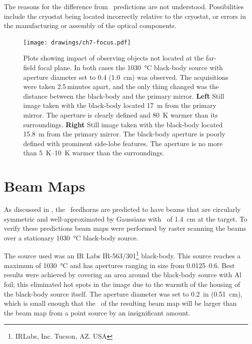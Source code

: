 The reasons for the difference from \ZEMAX\ predictions are not understood.
Possibilities include the cryostat being located incorrectly relative to the cryostat, or errors in the manufacturing or assembly of the optical components.

\begin{figure}
\centering
\texttt{[image: drawings/ch7-focus.pdf]}
\caption[Focus distance plots]{
  Plots showing impact of observing objects not located at the far-field focal plane.
  In both cases the \SI{1030}{\celsius} black-body source with aperture diameter set to \SI{0.4}{\in} (\SI{1.0}{\cm}) was observed. The acquisitions were taken 2.5\,minutes apart, and the only thing changed was the distance between the black-body and the primary mirror.
  \textbf{Left} Still image taken with the black-body located \SI{17}{\m} from the primary mirror.
  The aperture is clearly defined and \SI{80}{\K} warmer than its surroundings.
  \textbf{Right} Still image taken with the black-body located \SI{15.8}{\m} from the primary mirror.
  The black-body aperture is poorly defined with prominent side-lobe features.
  The aperture is no more than \SIrange{5}{10}{\K} warmer than the surroundings.
}
\label{fig:ch7-focus}
\end{figure}

\section{Beam Maps} \label{sec:ch7-beam-maps}

As discussed in , the \Imager\ feedhorns are predicted to have beams that are circularly symmetric and well-approximated by Gaussians with \FWHM\ of \SI{1.4}{\cm} at the target.
To verify these predictions beam maps were performed by raster scanning the beams over a stationary \SI{1030}{\celsius} black-body source.

The source used was an IR Labs IR-563/301\footnote{IRLabs, Inc. Tucson, AZ. USA} black-body.
This source reaches a maximum of \SI{1030}{\celsius} and has apertures ranging in size from \SIrange{0.0125}{0.6}{\in}.
Best results were achieved by covering an area around the black-body source with Al foil; this eliminated hot spots in the image due to the warmth of the housing of the black-body source itself.
The aperture diameter was set to \SI{0.2}{in} (\SI{0.51}{\cm}), which is small enough that the \FWHM\ of the resulting beam map will be larger than the beam map from a point source by an insignificant amount.

